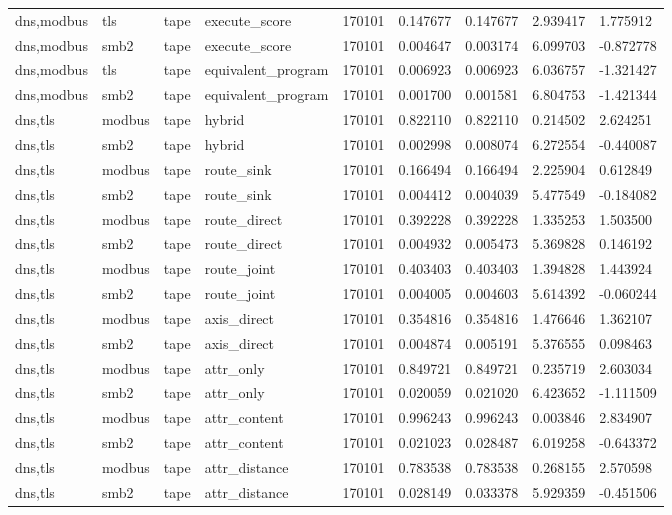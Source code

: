 \begin{tabular}{lllllllll}
dns,modbus & tls & tape & execute\_score & 170101 & 0.147677 & 0.147677 & 2.939417 & 1.775912 \\
dns,modbus & smb2 & tape & execute\_score & 170101 & 0.004647 & 0.003174 & 6.099703 & -0.872778 \\
dns,modbus & tls & tape & equivalent\_program & 170101 & 0.006923 & 0.006923 & 6.036757 & -1.321427 \\
dns,modbus & smb2 & tape & equivalent\_program & 170101 & 0.001700 & 0.001581 & 6.804753 & -1.421344 \\
dns,tls & modbus & tape & hybrid & 170101 & 0.822110 & 0.822110 & 0.214502 & 2.624251 \\
dns,tls & smb2 & tape & hybrid & 170101 & 0.002998 & 0.008074 & 6.272554 & -0.440087 \\
dns,tls & modbus & tape & route\_sink & 170101 & 0.166494 & 0.166494 & 2.225904 & 0.612849 \\
dns,tls & smb2 & tape & route\_sink & 170101 & 0.004412 & 0.004039 & 5.477549 & -0.184082 \\
dns,tls & modbus & tape & route\_direct & 170101 & 0.392228 & 0.392228 & 1.335253 & 1.503500 \\
dns,tls & smb2 & tape & route\_direct & 170101 & 0.004932 & 0.005473 & 5.369828 & 0.146192 \\
dns,tls & modbus & tape & route\_joint & 170101 & 0.403403 & 0.403403 & 1.394828 & 1.443924 \\
dns,tls & smb2 & tape & route\_joint & 170101 & 0.004005 & 0.004603 & 5.614392 & -0.060244 \\
dns,tls & modbus & tape & axis\_direct & 170101 & 0.354816 & 0.354816 & 1.476646 & 1.362107 \\
dns,tls & smb2 & tape & axis\_direct & 170101 & 0.004874 & 0.005191 & 5.376555 & 0.098463 \\
dns,tls & modbus & tape & attr\_only & 170101 & 0.849721 & 0.849721 & 0.235719 & 2.603034 \\
dns,tls & smb2 & tape & attr\_only & 170101 & 0.020059 & 0.021020 & 6.423652 & -1.111509 \\
dns,tls & modbus & tape & attr\_content & 170101 & 0.996243 & 0.996243 & 0.003846 & 2.834907 \\
dns,tls & smb2 & tape & attr\_content & 170101 & 0.021023 & 0.028487 & 6.019258 & -0.643372 \\
dns,tls & modbus & tape & attr\_distance & 170101 & 0.783538 & 0.783538 & 0.268155 & 2.570598 \\
dns,tls & smb2 & tape & attr\_distance & 170101 & 0.028149 & 0.033378 & 5.929359 & -0.451506 \\

\end{tabular}
